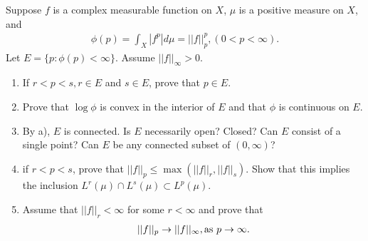 \documentclass[../main.tex]{subfiles}
\begin{document}
  \setcounter{exercise}{3}
  \begin{exercise}
    Suppose $ f $ is a complex measurable function on $ X $, $ \mu $ is a positive measure on $ X $, and
    \begin{align*}
      \phi(p) = \int_X |f ^{p} | d\mu = || f ||^p_p, (0 < p < \infty).
    \end{align*}
    Let $ E = \{p: \phi(p) < \infty\} $. Assume $ ||f||_\infty > 0 $.

    \begin{enumerate}
      \item If $ r < p < s, r\in E $ and $ s \in E $, prove that $ p \in E $.
      \item Prove that $ \log \phi $ is convex in the interior of $ E $ and that $ \phi $ is continuous on $ E $.
      \item By a), $ E $ is connected. Is $ E $ necessarily open? Closed? Can $ E $ consist of a single point? Can $ E $ be any connected subset of $ (0, \infty) $?
      \item if $ r < p < s $, prove that $ ||f||_p \le \max(||f||_r, ||f||_s) $. Show that this implies the inclusion $ L^r(\mu) \cap L^s(\mu) \subset L^p(\mu) $.
      \item Assume that $ ||f||_r < \infty $ for some $ r < \infty $ and prove that
      \begin{align*}
        ||f||_p \to ||f||_\infty, \text{as $ p \to \infty.$}
      \end{align*}
    \end{enumerate}

  \end{exercise}
\end{document}
